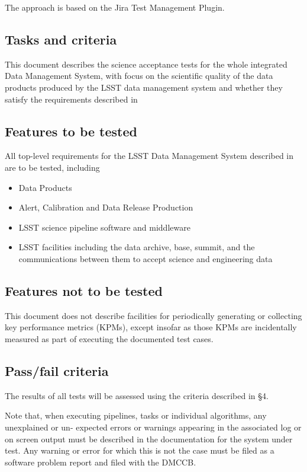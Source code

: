 \documentclass[DM,lsstdraft,STS,toc]{lsstdoc}
\begin{document}
The approach is based on the Jira Test Management Plugin. 

\subsection{Tasks and criteria}
\label{sec:tasks}

This document describes the science acceptance tests for the whole integrated Data Management System, 
with focus on the scientific quality of the data products produced by the LSST data management system and 
whether they satisfy the requirements described in 

\subsection{Features to be tested}
\label{sec:feat2test}

All top-level requirements for the LSST Data Management System described in  are to be tested, including 
\begin{itemize}
\item Data Products
\item Alert, Calibration and Data Release Production
\item LSST science pipeline software and middleware
\item LSST facilities including the data archive, base, summit, and the communications between them to accept science and engineering data
\end{itemize}

\subsection{Features not to be tested}
\label{sec:featnot2test}

This document does not describe facilities for periodically generating or collecting key performance metrics (KPMs), 
except insofar as those KPMs are incidentally measured as part of executing the documented test cases. 

\subsection{Pass/fail criteria}
\label{sec:passfail}

The results of all tests will be assessed using the criteria described in
 \S4.

Note that, when executing pipelines, tasks or individual algorithms, any unexplained or un- expected errors or warnings 
appearing in the associated log or on screen output must be described in the documentation for the system under test. 
Any warning or error for which this is not the case must be filed as a software problem report and filed with the DMCCB.
\end{document}
